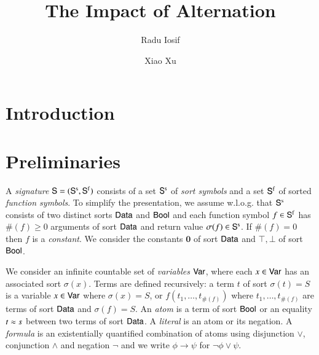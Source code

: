 \documentclass{llncs}
\begin{document}

\title{The Impact of Alternation}

\author{Radu Iosif \and Xiao Xu}


\maketitle

\begin{abstract}
\end{abstract}

\section{Introduction}

\section{Preliminaries}

A \emph{signature} $\mathsf{S} = (\mathsf{S}^\mathrm{s},\mathsf{S}^\mathrm{f})$ consists of a
set $\mathsf{S}^\mathrm{s}$ of \emph{sort symbols} and a set $\mathsf{S}^\mathrm{f}$ of
sorted \emph{function symbols}. To simplify the presentation, we
assume w.l.o.g. that $\mathsf{S}^\mathrm{s}$ consists of two distinct sorts
$\mathsf{Data}$ and $\mathsf{Bool}$ and each function symbol $f \in \mathsf{S}^\mathrm{f}$ has
$\#(f) \geq 0$ arguments of sort $\mathsf{Data}$ and return value $\sigma(f)
\in \mathsf{S}^\mathrm{s}$. If $\#(f)=0$ then $f$ is a \emph{constant}. We
consider the constants $\mathbf{0}$ of sort $\mathsf{Data}$ and $\top,\bot$ of
sort $\mathsf{Bool}$.

We consider an infinite countable set of \emph{variables} $\mathsf{Var}$,
where each $x \in \mathsf{Var}$ has an associated sort $\sigma(x)$. Terms are
defined recursively: a term $t$ of sort $\sigma(t)=S$ is a variable $x
\in \mathsf{Var}$ where $\sigma(x)=S$, or $f(t_1,\ldots,t_{\#(f)})$ where
$t_1,\ldots,t_{\#(f)}$ are terms of sort $\mathsf{Data}$ and $\sigma(f)=S$. An
\emph{atom} is a term of sort $\mathsf{Bool}$ or an equality $t \approx s$
between two terms of sort $\mathsf{Data}$. A \emph{literal} is an atom or its
negation. A \emph{formula} is an existentially quantified combination
of atoms using disjunction $\vee$, conjunction $\wedge$ and negation
$\neg$ and we write $\phi \rightarrow \psi$ for $\neg\phi \vee \psi$.
\end{document}
